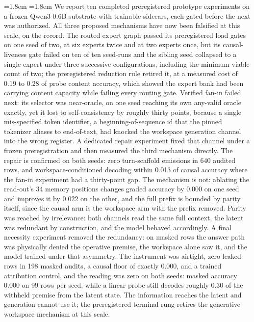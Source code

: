 \documentclass[10pt,a4paper]{article}
\begin{document}
\begin{list}{}{\leftmargin=1.8em \rightmargin=1.8em}
We report ten completed preregistered prototype experiments on a frozen
Qwen3-0.6B substrate with trainable sidecars, each gated before the next was
authorized. All three proposed mechanisms have now been falsified at this
scale, on the record. The routed expert graph passed its preregistered load
gates on one seed of two, at six experts twice and at two experts once, but
its causal-liveness gate failed on ten of ten seed-runs and the sibling seed
collapsed to a single expert under three successive configurations, including
the minimum viable count of two; the preregistered reduction rule retired it,
at a measured cost of 0.19 to 0.28 of probe content accuracy, which showed the
expert bank had been carrying content capacity while failing every routing
gate. Verified fan-in failed next: its selector was near-oracle, on one
seed reaching its own any-valid oracle exactly, yet it lost to
self-consistency by roughly thirty points, because a single mis-specified
token identifier, a beginning-of-sequence id that the pinned tokenizer aliases
to end-of-text, had knocked the workspace generation channel into the wrong
register. A dedicated repair experiment fixed that channel under a frozen
preregistration and then measured the third mechanism directly. The repair is confirmed on both
seeds: zero turn-scaffold emissions in 640 audited rows, and
workspace-conditioned decoding within 0.013 of causal accuracy where the
fan-in experiment had a thirty-point gap. The mechanism is not: ablating the read-out's 34
memory positions changes graded accuracy by 0.000 on one seed and improves it
by 0.022 on the other, and the full prefix is bounded by parity itself, since
the causal arm is the workspace arm with the prefix removed. Parity was
reached by irrelevance: both channels read the same full context, the latent
was redundant by construction, and the model behaved accordingly. A final necessity experiment
removed the redundancy: on masked rows the answer path was physically denied
the operative premise, the workspace alone saw it, and the model trained
under that asymmetry. The instrument was airtight, zero leaked rows in 198
masked audits, a causal floor of exactly 0.000, and a trained attribution
control, and the reading was zero on both seeds: masked accuracy 0.000 on 99
rows per seed, while a linear probe still decodes roughly 0.30 of the
withheld premise from the latent state. The information reaches the latent
and generation cannot use it; the preregistered terminal rung retires the
generative workspace mechanism at this scale.


\end{list}
\end{document}
